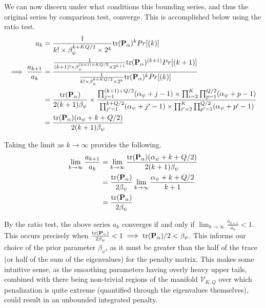 \documentclass[12pt]{article}
\begin{document}
We can now discern under what conditions this bounding series, and thus the original series by comparison test, converge. This is accomplished below using the ratio test.
\begin{align*}
    a_k & =  \frac{1}{k! \times \beta_\psi^{k + KQ/2} \times 2^k} {\rm tr}(\mathbf{P}_\alpha)^k Pr[(k)]\\
    \implies \frac{a_{k+1}}{a_k} & = \frac{\frac{1}{(k+1)! \times \beta_\psi^{(k+1) + KQ/2} \times 2^{k+1}} {\rm tr}(\mathbf{P}_\alpha)^{(k+1)} Pr[(k+1)]}{\frac{1}{k! \times \beta_\psi^{k + KQ/2} \times 2^k} {\rm tr}(\mathbf{P}_\alpha)^k Pr[(k)]}\\
    & = \frac{{\rm tr}(\mathbf{P}_\alpha)}{2(k+1)\beta_\psi} \times \frac{\prod_{j = 1}^{(k+1) + Q/2}(\alpha_\psi + j - 1) \times \prod_{i = 2}^{K}\prod_{p = 1}^{Q/2}(\alpha_{\psi} + p - 1)}{\prod_{j' = 1}^{k + Q/2}(\alpha_\psi + j' - 1) \times \prod_{i' = 2}^{K}\prod_{p' = 1}^{Q/2}(\alpha_{\psi} + p' - 1)}\\
    & = \frac{{\rm tr}(\mathbf{P}_\alpha)(\alpha_\psi + k + Q/2)}{2(k+1)\beta_\psi}
\end{align*}

Taking the limit as $k \rightarrow \infty$ provides the following.
\begin{align*}
    \lim_{k \rightarrow \infty} \frac{a_{k+1}}{a_k} & = \lim_{k \rightarrow \infty} \frac{{\rm tr}(\mathbf{P}_\alpha)(\alpha_\psi + k + Q/2)}{2(k+1)\beta_\psi}\\
    & = \frac{{\rm tr}(\mathbf{P}_\alpha)}{2\beta_\psi} \lim_{k \rightarrow \infty} \frac{\alpha_\psi + k + Q/2}{k + 1}\\
    & = \frac{{\rm tr}(\mathbf{P}_\alpha)}{2\beta_\psi}
\end{align*}

By the ratio test, the above series $a_k$ converges if and only if $\lim_{k \rightarrow \infty} \frac{a_{k + 1}}{a_k} < 1$. This occurs precisely when $ \frac{{\rm tr}(\mathbf{P}_\alpha)}{2\beta_\psi} < 1 \implies {\rm tr}(\mathbf{P}_\alpha)/2 < \beta_\psi$. This informs our choice of the prior parameter $\beta_\psi$, as it must be greater than the half of the trace (or half of the sum of the eigenvalues) for the penalty matrix. This makes some intuitive sense, as the smoothing parameters having overly heavy upper tails, combined with there being non-trivial regions of the manifold $\mathcal{V}_{K,Q}$ over which penalization is quite extreme (quantified through the eigenvalues themselves), could result in an unbounded integrated penalty. 
\end{document}
